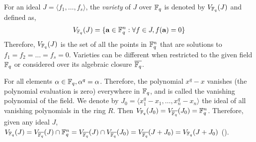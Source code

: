 \par For an ideal $J = \langle f_1, \dots, f_s \rangle$, the {\it variety} of
$J$ over ${\mathbb{F}}_q$ is denoted by ${V_{{\mathbb{F}}_{q}}(J)}$ and defined as, 
\begin{align*}
{V_{{\mathbb{F}}_{q}}(J)} = \{\mathbf{a} \in {\mathbb{F}}_q^n: \forall f \in J,f(\mathbf{a})=0\}
\end{align*}
Therefore, ${V_{{\mathbb{F}}_{q}}(J)}$ is the set of all the points in ${\mathbb{F}}_q^n$ that are
solutions to $f_1 = f_2 = \dots = f_s = 0$. Varieties can 
be different when restricted to the given field ${\mathbb{F}}_{q}$
or considered over its algebraic closure ${\overline{{\mathbb{F}}_q}}$.

\par For all elements $\alpha \in {\mathbb{F}}_{q}, \alpha^q = \alpha$. Therefore, the
polynomial $x^q-x$ vanishes (the polynomial evaluation is zero)
everywhere in ${\mathbb{F}}_{q}$, and is called the
vanishing polynomial of the field. We denote by $J_0 = \langle
x_1^q-x_1,\dots,x_n^q-x_n\rangle$ the ideal of all vanishing
polynomials in the ring $R$. Then $V_{{\mathbb{F}}_{q}}(J_0) = V_{{\overline{{\mathbb{F}}_q}}}(J_0) =
{\mathbb{F}}_{q}^n$. Therefore, given any ideal $J$, $V_{{\mathbb{F}}_{q}}(J) = V_{{\overline{{\mathbb{F}}_q}}}(J)
\cap{\mathbb{F}}_{q}^n = V_{{\overline{{\mathbb{F}}_q}}}(J) \cap V_{{\overline{{\mathbb{F}}_q}}}(J_0) = V_{{\overline{{\mathbb{F}}_q}}}(J+J_0) =
V_{{\mathbb{F}}_{q}}(J+J_0)$ (\cite{gao:gf-gb-ms}).

